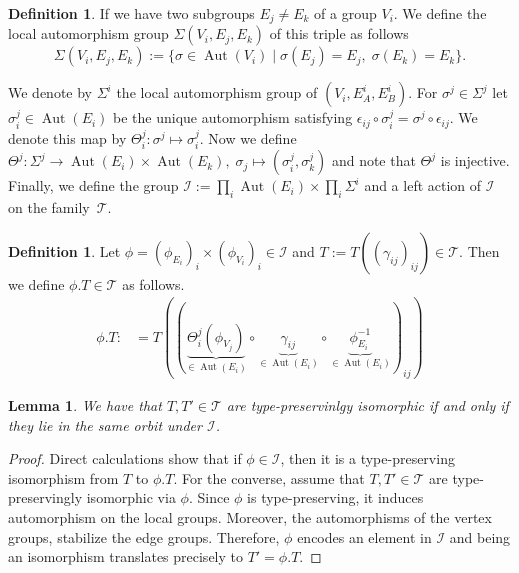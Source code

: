 \documentclass[dvipsnames]{article}
\newtheorem{lemma}[theorem]{Lemma}
\theoremstyle{definition}
\newtheorem{definition}[theorem]{Definition}
\theoremstyle{remark}
\DeclareMathOperator{\Aut}{Aut}
\begin{document}
    \begin{definition}
        If we have two subgroups $E_j \neq E_k$ of a group $V_i$. We define the local automorphism group $\Sigma(V_i, E_j, E_k)$ of this triple as follows
        \[
            \Sigma(V_i, E_j, E_k) := \{\sigma\in \Aut(V_i)\mid \sigma(E_j) = E_j, \; \sigma(E_k) = E_k \}.
        \]
    \end{definition}

    We denote by $\Sigma^i$ the local automorphism group of $(V_i, E_A^i, E_B^i)$. 
    For $\sigma^j \in \Sigma^j$ let $\sigma^j_i \in \Aut(E_i)$ be the unique automorphism satisfying $\epsilon_{ij} \circ \sigma_i^j = \sigma^j \circ \epsilon_{ij}$. We denote this map by $\Theta^j_i:\sigma^j \mapsto \sigma^j_i$.
    Now we define $\Theta^j : \Sigma^j \to \Aut(E_i) \times \Aut(E_k), \; \sigma_j\mapsto (\sigma_i^j, \sigma_k^j)$ and note that $\Theta^j$ is injective.
    Finally, we define the group $\mathcal I:=\prod_i \Aut(E_i) \times \prod_i \Sigma^i$ and a left action of $\mathcal I$ on the family~$\mathcal T$.

    \begin{definition}
        Let $\phi=(\phi_{E_i})_i\times(\phi_{V_i})_i\in \mathcal I$ and $T := T((\gamma_{ij})_{ij}) \in \mathcal T$. Then we define $\phi.T \in \mathcal T$ as follows.
        \begin{align*}
        \phi . T:&= T\left((\underbrace{\Theta_i^j(\phi_{V_j})}_{\in \Aut(E_i)}\circ \underbrace{\gamma_{ij}}_{\in \Aut(E_i)}\circ \underbrace{\phi_{E_i}^{-1}}_{\in \Aut(E_i)})_{ij}\right)
        \end{align*}
    \end{definition}

    \begin{lemma}
        We have that $T, T'\in \mathcal{T}$ are type-preservinlgy isomorphic if and only if they lie in the same orbit under $\mathcal I$.
    \end{lemma}

    \begin{proof}
        Direct calculations show that if $\phi \in \mathcal I$, then it is a type-preserving isomorphism from $T$ to $\phi.T$. For the converse, assume that $T, T' \in \mathcal T$ are type-preservingly isomorphic via $\phi$. Since $\phi$ is type-preserving, it induces automorphism on the local groups. Moreover, the automorphisms of the vertex groups, stabilize the edge groups. Therefore, $\phi$ encodes an element in $\mathcal I$ and being an isomorphism translates precisely to $T' = \phi.T$.
    \end{proof}
    
\end{document}
